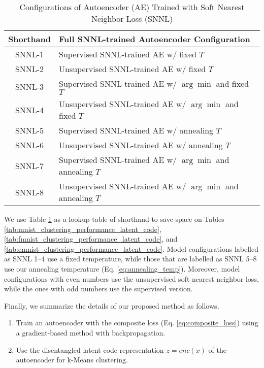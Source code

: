 \documentclass[conference]{IEEEtran}
\begin{document}
\begin{table}[htb]
    \caption{Configurations of Autoencoder (AE) Trained with Soft Nearest Neighbor Loss (SNNL)}
    \label{tab:model_lookup}
    \centering
    \begin{tabular}{c|l}
        \toprule
         Shorthand & Full SNNL-trained Autoencoder Configuration \\ 
        \midrule
         SNNL-1 & Supervised SNNL-trained AE w/ fixed $T$ \\
         SNNL-2 & Unsupervised SNNL-trained AE w/ fixed $T$ \\
         SNNL-3 & Supervised SNNL-trained AE w/ $\arg\min$ and fixed $T$\\
         SNNL-4 & Unsupervised SNNL-trained AE w/ $\arg\min$ and fixed $T$\\
         SNNL-5 & Supervised SNNL-trained AE w/ annealing $T$\\
         SNNL-6 & Unsupervised SNNL-trained AE w/ annealing $T$\\
         SNNL-7 & Supervised SNNL-trained AE w/ $\arg\min$ and annealing $T$\\
         SNNL-8 & Unsupervised SNNL-trained AE w/ $\arg\min$ and annealing $T$\\
        \bottomrule
    \end{tabular}
\end{table}

We use Table \ref{tab:model_lookup} as a lookup table of shorthand to save space on Tables \ref{tab:mnist_clustering_performance_latent_code}, \ref{tab:fmnist_clustering_performance_latent_code}, and \ref{tab:emnist_clustering_performance_latent_code}. Model configurations labelled as SNNL 1--4 use a fixed temperature, while those that are labelled as SNNL 5--8 use our annealing temperature (Eq. \ref{eq:annealing_temp}). Moreover, model configurations with even numbers use the unsupervised soft nearest neighbor loss, while the ones with odd numbers use the supervised version.

Finally, we summarize the details of our proposed method as follows,

\begin{enumerate}
    \item Train an autoencoder with the composite loss (Eq. \ref{eq:composite_loss}) using a gradient-based method with backpropagation.
    \item Use the disentangled latent code representation $z = enc(x)$ of the autoencoder for k-Means clustering.
\end{enumerate}
\end{document}
